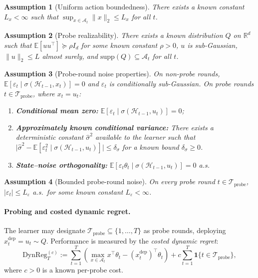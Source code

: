 \documentclass{article}
\newcommand{\R}{\mathbb{R}}
\newcommand{\E}{\mathbb{E}}
\newcommand{\cA}{\mathcal{A}}
\newcommand{\cH}{\mathcal{H}}
\newcommand{\cTprobe}{\mathcal{T}_{\mathrm{probe}}}
\newcommand{\DynReg}{\mathrm{DynReg}}
\newcommand{\supp}{\mathrm{supp}}
\newtheorem{assumption}{Assumption}
\begin{document}
\begin{assumption}[Uniform action boundedness]
\label{assum:action_boundedness}
There exists a known constant $L_x<\infty$ such that
$\sup_{x\in\cA_t}\|x\|_2 \le L_x$ for all $t$.
\end{assumption}

\begin{assumption}[Probe realizability]
\label{assum:probe_realizability}
There exists a known distribution $Q$ on $\R^d$ such that
$\E[uu^\top] \succeq \rho I_d$ for some known constant $\rho>0$,
$u$ is sub-Gaussian,
$\|u\|_2 \le L$ almost surely,
and $\supp(Q)\subseteq \cA_t$ for all $t$.
\end{assumption}

\begin{assumption}[Probe-round noise properties]
\label{assum:probe_noise}
On non-probe rounds, $\E[\varepsilon_t \mid \sigma(\cH_{t-1},x_t)] = 0$ and $\varepsilon_t$ is conditionally sub-Gaussian.
On probe rounds $t\in \cTprobe$, where $x_t=u_t$:
\begin{enumerate}[label=(\roman*)]
    \item \textbf{Conditional mean zero:} $\E[\varepsilon_t \mid \sigma(\cH_{t-1},u_t)] = 0$;
    \item  \textbf{Approximately known conditional variance:} There exists a deterministic constant $\hat\sigma^2$ available to the learner such that
$\bigl|\hat\sigma^2 - \E[\varepsilon_t^2 \mid \sigma(\cH_{t-1}, u_t)]\bigr| \le \delta_\sigma$ for a known bound $\delta_\sigma \ge 0$.
    \item \textbf{State--noise orthogonality:}
    $\E[\varepsilon_t \theta_t \mid \sigma(\cH_{t-1},u_t)] = 0$ a.s.
\end{enumerate}
\end{assumption}

\begin{assumption}[Bounded probe-round noise]
  \label{assum:bounded_probe_noise}
  On every probe round $t \in \cTprobe$,
  $|\varepsilon_t| \le L_\varepsilon$ a.s.\
  for some known constant $L_\varepsilon < \infty$.
\end{assumption}

\paragraph{Probing and costed dynamic regret.}
The learner may designate $\cTprobe \subseteq \{1, \ldots, T\}$ as probe rounds, deploying $x_t^{\mathrm{dep}} = u_t \sim Q$.
Performance is measured by the \emph{costed dynamic regret}:
\begin{equation}
  \DynReg_T^{(c)} := \sum_{t=1}^T \left(\max_{x \in \cA_t} x^\top \theta_t - (x_t^{\mathrm{dep}})^\top \theta_t\right) + c \sum_{t=1}^T \mathbf{1}\{t \in \cTprobe\},
  \label{eq:costed_regret}
\end{equation}
where $c > 0$ is a known per-probe cost.
\end{document}
